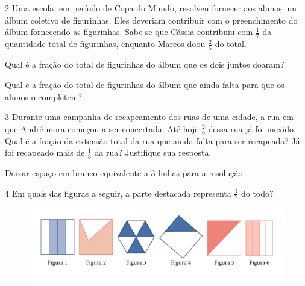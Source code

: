 \num{2} Uma escola, em período de Copa do Mundo, resolveu fornecer aos alunos um
álbum coletivo de figurinhas. Eles deveriam contribuir com o
preenchimento do álbum fornecendo as figurinhas. Sabe-se que Cássia
contribuiu com $\frac{1}{7}$ da quantidade total de figurinhas, enquanto Marcos
doou $\frac{2}{5}$ do total.

\begin{escolha}
\item
  Qual é a fração do total de figurinhas do álbum que os dois juntos doaram?

\bigskip

\item
  Qual é a fração do total de figurinhas do álbum que ainda falta para que os alunos o completem?

\bigskip
\end{escolha}


\num{3} Durante uma campanha de recapeamento dos ruas de uma cidade, a rua em
que André mora começou a ser concertada. Até hoje $\frac{2}{9}$ dessa rua já foi mexido.
Qual é a fração da extensão total da rua que ainda falta para ser
recapeada? Já foi recapeado mais de $\frac{1}{3}$ da rua? Justifique sua resposta.

Deixar espaço em branco equivalente a 3 linhas para a resolução

\begin{mdframed}[linewidth=2pt,linecolor=salmao,roundcorner=2pt]

\vspace{2cm}
\end{mdframed}

\num{4} Em quais das figuras a seguir, a parte destacada representa $\frac{1}{2}$ do todo?

\begin{figure}[htpb!]
\centering
\includegraphics[width=\textwidth]{media/image52.png}
\end{figure}

